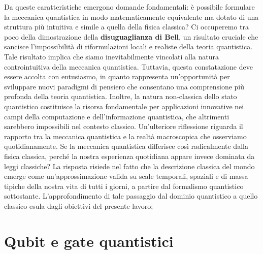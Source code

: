 \documentclass[a4paper,12pt]{report}
\theoremstyle{plain}
\begin{document}
Da queste caratteristiche emergono domande fondamentali: è possibile formulare la meccanica quantistica in modo matematicamente equivalente ma dotato di una struttura più intuitiva e simile a quella della fisica classica? Ci occuperemo tra poco della dimostrazione della \textbf{disuguaglianza di Bell}, un risultato cruciale che sancisce l'impossibilità di riformulazioni locali e realiste della teoria quantistica. Tale risultato implica che siamo inevitabilmente vincolati alla natura controintuitiva della meccanica quantistica. Tuttavia, questa constatazione deve essere accolta con entusiasmo, in quanto rappresenta un'opportunità per sviluppare nuovi paradigmi di pensiero che consentano una comprensione più profonda della teoria quantistica. Inoltre, la natura non-classica dello stato quantistico costituisce la risorsa fondamentale per applicazioni innovative nei campi della computazione e dell'informazione quantistica, che altrimenti sarebbero impossibili nel contesto classico.
Un'ulteriore riflessione riguarda il rapporto tra la meccanica quantistica e la realtà macroscopica che osserviamo quotidianamente. Se la meccanica quantistica differisce così radicalmente dalla fisica classica, perché la nostra esperienza quotidiana appare invece dominata da leggi classiche? La risposta risiede nel fatto che la descrizione classica del mondo emerge come un'approssimazione valida su scale temporali, spaziali e di massa tipiche della nostra vita di tutti i giorni, a partire dal formalismo quantistico sottostante. L'approfondimento di tale passaggio dal dominio quantistico a quello classico esula dagli obiettivi del presente lavoro;

\chapter{Qubit e gate quantistici}
\end{document}
